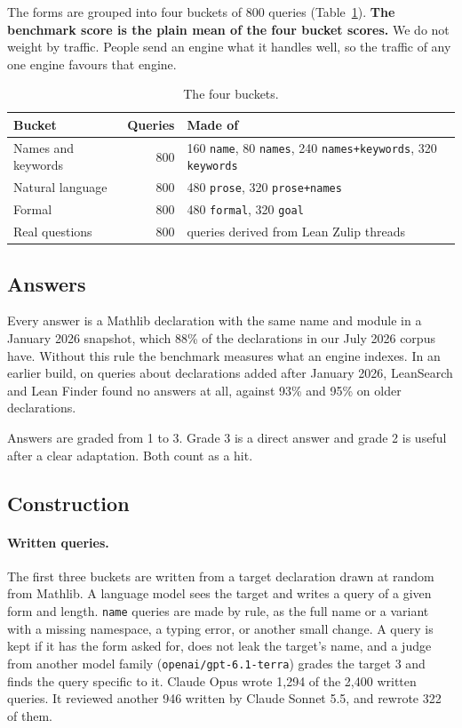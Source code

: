 \documentclass{article}
\newcommand{\thead}[1]{\textbf{#1}}
\newcommand{\rowrule}{\arrayrulecolor{nBorderLight}\specialrule{0.4pt}{3pt}{3pt}\arrayrulecolor{nBorder}}
\newcommand{\code}[1]{\texttt{\small #1}}
\begin{document}
The forms are grouped into four buckets of 800 queries
(Table~\ref{tab:buckets}). \textbf{The benchmark score is the plain mean of
the four bucket scores.} We do not weight by traffic. People send an engine
what it handles well, so the traffic of any one engine favours that engine.

\begin{table}[t]
\centering\small
\caption{The four buckets.}
\label{tab:buckets}
\begin{tabular}{@{}lrl@{}}
\toprule
\thead{Bucket} & \thead{Queries} & \thead{Made of} \\
\midrule
Names and keywords & 800 & 160 \code{name}, 80 \code{names}, 240 \code{names+keywords}, 320 \code{keywords} \\
\rowrule
Natural language & 800 & 480 \code{prose}, 320 \code{prose+names} \\
\rowrule
Formal & 800 & 480 \code{formal}, 320 \code{goal} \\
\rowrule
Real questions & 800 & queries derived from Lean Zulip threads \\
\bottomrule
\end{tabular}
\end{table}

\subsection{Answers}

Every answer is a Mathlib declaration with the same name and module in a
January 2026 snapshot, which 88\% of the declarations in our July 2026 corpus
have. Without this rule the benchmark measures what an engine indexes. In an
earlier build, on queries about declarations added after January 2026,
LeanSearch and Lean Finder found no answers at all, against 93\% and 95\% on
older declarations.

Answers are graded from 1 to 3. Grade 3 is a direct answer and grade 2 is
useful after a clear adaptation. Both count as a hit.

\subsection{Construction}

\paragraph{Written queries.} The first three buckets are written from a
target declaration drawn at random from Mathlib. A language model sees the
target and writes a query of a given form and length. \code{name} queries are
made by rule, as the full name or a variant with a missing namespace, a typing
error, or another small change. A query is kept if it has the form asked for, does not
leak the target's name, and a judge from another model family
(\code{openai/gpt-6.1-terra}) grades the target 3 and finds the query
specific to it. Claude Opus wrote 1,294 of the 2,400 written queries. It
reviewed another 946 written by Claude Sonnet 5.5, and rewrote 322 of them.
\end{document}
